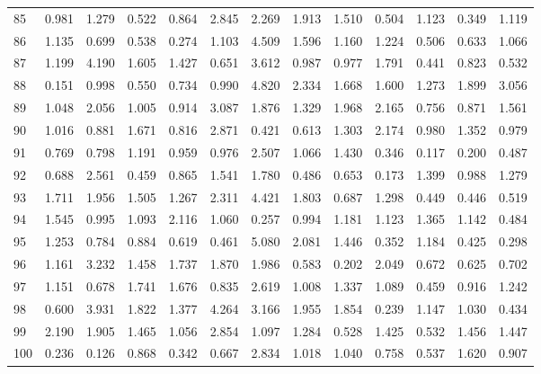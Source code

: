 \begin{tabular}{lrrrrrrrrrrrr}
85  &  0.981 &  1.279 &  0.522 &  0.864 &  2.845 &  2.269 &  1.913 &  1.510 &  0.504 &  1.123 &  0.349 &  1.119 \\
86  &  1.135 &  0.699 &  0.538 &  0.274 &  1.103 &  4.509 &  1.596 &  1.160 &  1.224 &  0.506 &  0.633 &  1.066 \\
87  &  1.199 &  4.190 &  1.605 &  1.427 &  0.651 &  3.612 &  0.987 &  0.977 &  1.791 &  0.441 &  0.823 &  0.532 \\
88  &  0.151 &  0.998 &  0.550 &  0.734 &  0.990 &  4.820 &  2.334 &  1.668 &  1.600 &  1.273 &  1.899 &  3.056 \\
89  &  1.048 &  2.056 &  1.005 &  0.914 &  3.087 &  1.876 &  1.329 &  1.968 &  2.165 &  0.756 &  0.871 &  1.561 \\
90  &  1.016 &  0.881 &  1.671 &  0.816 &  2.871 &  0.421 &  0.613 &  1.303 &  2.174 &  0.980 &  1.352 &  0.979 \\
91  &  0.769 &  0.798 &  1.191 &  0.959 &  0.976 &  2.507 &  1.066 &  1.430 &  0.346 &  0.117 &  0.200 &  0.487 \\
92  &  0.688 &  2.561 &  0.459 &  0.865 &  1.541 &  1.780 &  0.486 &  0.653 &  0.173 &  1.399 &  0.988 &  1.279 \\
93  &  1.711 &  1.956 &  1.505 &  1.267 &  2.311 &  4.421 &  1.803 &  0.687 &  1.298 &  0.449 &  0.446 &  0.519 \\
94  &  1.545 &  0.995 &  1.093 &  2.116 &  1.060 &  0.257 &  0.994 &  1.181 &  1.123 &  1.365 &  1.142 &  0.484 \\
95  &  1.253 &  0.784 &  0.884 &  0.619 &  0.461 &  5.080 &  2.081 &  1.446 &  0.352 &  1.184 &  0.425 &  0.298 \\
96  &  1.161 &  3.232 &  1.458 &  1.737 &  1.870 &  1.986 &  0.583 &  0.202 &  2.049 &  0.672 &  0.625 &  0.702 \\
97  &  1.151 &  0.678 &  1.741 &  1.676 &  0.835 &  2.619 &  1.008 &  1.337 &  1.089 &  0.459 &  0.916 &  1.242 \\
98  &  0.600 &  3.931 &  1.822 &  1.377 &  4.264 &  3.166 &  1.955 &  1.854 &  0.239 &  1.147 &  1.030 &  0.434 \\
99  &  2.190 &  1.905 &  1.465 &  1.056 &  2.854 &  1.097 &  1.284 &  0.528 &  1.425 &  0.532 &  1.456 &  1.447 \\
100 &  0.236 &  0.126 &  0.868 &  0.342 &  0.667 &  2.834 &  1.018 &  1.040 &  0.758 &  0.537 &  1.620 &  0.907 \\
\bottomrule
\end{tabular}
